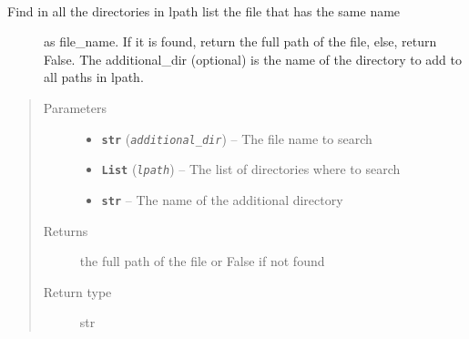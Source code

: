 \documentclass[a4paper,10pt,english]{sphinxmanual}
\begin{document}

\begin{fulllineitems}
\label{commands/apidoc/src:src.utilsSat.error}
\end{fulllineitems}


\begin{fulllineitems}
\label{commands/apidoc/src:src.utilsSat.find_file_in_lpath}~\begin{description}
\item[{Find in all the directories in lpath list the file that has the same name}] \leavevmode
as file\_name. If it is found, return the full path of the file, else,
return False. 
The additional\_dir (optional) is the name of the directory to add to all 
paths in lpath.

\end{description}
\begin{quote}\begin{description}
\item[{Parameters}] \leavevmode\begin{itemize}
\item {} 
\textbf{\texttt{str}} (\emph{\texttt{additional\_dir}}) -- The file name to search

\item {} 
\textbf{\texttt{List}} (\emph{\texttt{lpath}}) -- The list of directories where to search

\item {} 
\textbf{\texttt{str}} -- The name of the additional directory

\end{itemize}

\item[{Returns}] \leavevmode
the full path of the file or False if not found

\item[{Return type}] \leavevmode
str

\end{description}\end{quote}

\end{fulllineitems}
\end{document}
